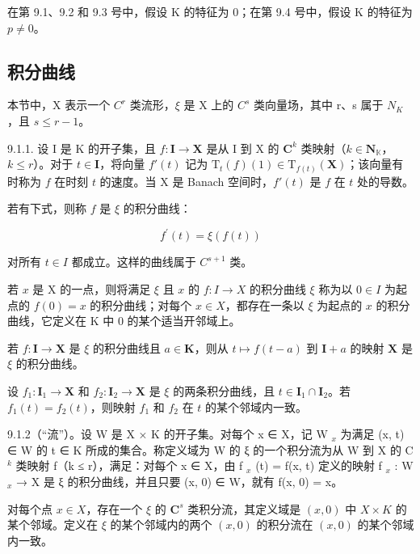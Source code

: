 在第 9.1、9.2 和 9.3 号中，假设 K 的特征为 0；在第 9.4 号中，假设 K 的特征为 \(p \neq 0\)。

\subsection{积分曲线}

本节中，X 表示一个 \(C^{r}\) 类流形，\(\xi\) 是 X 上的 \(C^{s}\) 类向量场，其中 r、s 属于 \(N_{K}\)，且 \(s \leqslant r - 1\)。

9.1.1. 设 I 是 K 的开子集，且 \(f: \mathbf{I} \to \mathbf{X}\) 是从 I 到 X 的 \(\mathbf{C}^k\) 类映射（\(k \in \mathbf{N}_{\mathbb{K}}\)，\(k \leqslant r\)）。对于 \(t \in \mathbf{I}\)，将向量 \(f'(t)\) 记为 \(\mathrm{T}_t(f)(1) \in \mathrm{T}_{f(t)}(\mathbf{X})\)；该向量有时称为 \(f\) 在时刻 \(t\) 的速度。当 X 是 Banach 空间时，\(f'(t)\) 是 \(f\) 在 \(t\) 处的导数。

若有下式，则称 \(f\) 是 \(\xi\) 的积分曲线：

\[
f ^ {\prime} (t) = \xi (f (t))\tag{1}
\]

对所有 \(t \in I\) 都成立。这样的曲线属于 \(C^{s+1}\) 类。

若 \(x\) 是 X 的一点，则将满足 \(\xi\) 且 \(x\) 的 \(f: I \to X\) 的积分曲线 \(\xi\) 称为以 \(0 \in I\) 为起点的 \(f(0) = x\) 的积分曲线；对每个 \(x \in X\)，都存在一条以 \(\xi\) 为起点的 \(x\) 的积分曲线，它定义在 K 中 0 的某个适当开邻域上。

若 \(f: \mathbf{I} \to \mathbf{X}\) 是 \(\xi\) 的积分曲线且 \(a \in \mathbf{K}\)，则从 \(t \mapsto f(t - a)\) 到 \(\mathbf{I} + a\) 的映射 \(\mathbf{X}\) 是 \(\xi\) 的积分曲线。

设 \(f_{1}\colon\mathbf{I}_{1}\to\mathbf{X}\) 和 \(f_{2}\colon\mathbf{I}_{2}\to\mathbf{X}\) 是 \(\xi\) 的两条积分曲线，且 \(t\in\mathbf{I}_{1}\cap\mathbf{I}_{2}\)。若 \(f_{1}(t)=f_{2}(t)\)，则映射 \(f_{1}\) 和 \(f_{2}\) 在 \(t\) 的某个邻域内一致。

9.1.2（“流”）。设 W 是 X × K 的开子集。对每个 x ∈ X，记 W \(_{x}\) 为满足 (x, t) ∈ W 的 t ∈ K 所成的集合。称定义域为 W 的 ξ 的一个积分流为从 W 到 X 的 C \(^{k}\) 类映射 f（k ≤ r），满足：对每个 x ∈ X，由 f \(_{x}\) (t) = f(x, t) 定义的映射 f \(_{x}\) : W \(_{x}\) → X 是 ξ 的积分曲线，并且只要 (x, 0) ∈ W，就有 f(x, 0) = x。

对每个点 \(x \in X\)，存在一个 \(\xi\) 的 \(\mathbf{C}^s\) 类积分流，其定义域是 \((x, 0)\) 中 \(X \times K\) 的某个邻域。定义在 \(\xi\) 的某个邻域内的两个 \((x, 0)\) 的积分流在 \((x, 0)\) 的某个邻域内一致。

